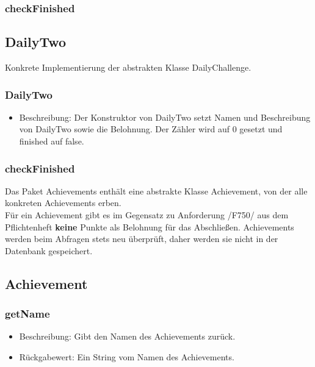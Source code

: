 \documentclass[a4paper]{scrreprt}
\begin{document}
	\subsubsection{checkFinished}

	\subsection{DailyTwo}
	Konkrete Implementierung der abstrakten Klasse DailyChallenge.
	\subsubsection{DailyTwo}
	\begin{itemize}
		\item Beschreibung: Der Konstruktor von DailyTwo setzt Namen und Beschreibung von DailyTwo sowie die Belohnung. Der Zähler wird auf 0 gesetzt und finished auf false.
	\end{itemize}
	\subsubsection{checkFinished}

	Das Paket Achievements enthält eine abstrakte Klasse Achievement, von der alle konkreten Achievements erben. \\
	Für ein Achievement gibt es im Gegensatz zu Anforderung /F750/ aus dem Pflichtenheft \textbf{keine} Punkte als Belohnung für das Abschließen.
	Achievements werden beim Abfragen stets neu überprüft, daher werden sie nicht in der Datenbank gespeichert.

	\subsection{Achievement}
	\subsubsection{getName}
	\begin{itemize}
		\item Beschreibung: Gibt den Namen des Achievements zurück.
		\item Rückgabewert: Ein String vom Namen des Achievements.
	\end{itemize}
\end{document}
